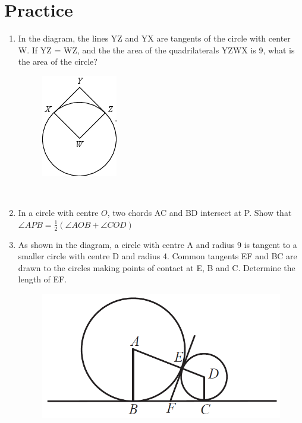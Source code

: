 \documentclass[12pt]{article}
\begin{document}
\section{Practice}
	\begin{enumerate}
		\item In the diagram, the lines YZ and YX are tangents of the circle with center W. If YZ = WZ, and the the area of the quadrilaterals YZWX is 9, what is the area of the circle?  
		\begin{figure}[h!]
			\centering
			\includegraphics[height=0.2\textheight]{Graphics/Week_13/Questions/Q2.png}
		\end{figure}\\ 
	    
	    \item In a circle with centre $O$, two chords AC and BD intersect at P. Show that $\angle APB =\frac{1}{2}(\angle AOB + \angle COD)$ \spacing

	    
	    \item As shown in the diagram, a circle with centre A and radius 9 is tangent to a smaller circle with centre D and
	    radius 4. Common tangents EF and BC are drawn to the circles making points of contact at E, B and C.
	    Determine the length of EF.
	    \begin{figure}[h!]
	    	\centering
	    	\includegraphics[height=0.2\textheight]{Graphics/Week_13/Questions/Q1.png}
	    \end{figure}
	\end{enumerate}
\end{document}
